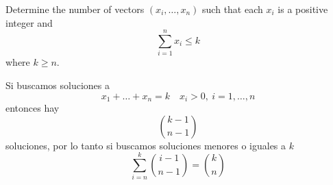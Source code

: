 \item Determine the number of vectors $(x_i,\dots,x_n)$ such that each $x_i$ is a positive integer and
\[ 
\sum_{i=1}^{n} x_i \le k
\]
where $k \ge n$.

Si buscamos soluciones a
\[ x_1 + \dots + x_n = k\quad x_i > 0,\ i = 1, \dots, n \]
entonces hay
\[ \binom{k-1}{n-1} \]
soluciones, por lo tanto si buscamos soluciones menores o iguales a $k$
\[ \sum_{i=n}^k \binom{i-1}{n-1} = \binom{k}{n} \]